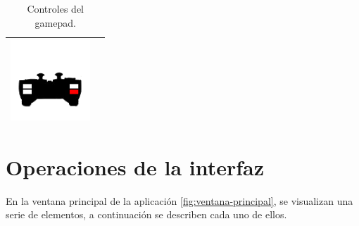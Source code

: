 \begin{table}[H]
\begin{center}
\begin{tabular}{|p{3cm}|p{8cm}|}
      \hline
      \includegraphics[width=3cm]{./imagenes/pad-12.png} & \vspace*{-.8in}{Sin función.} \\
      \hline
    \end{tabular}
  \end{center}
  \caption{Controles del gamepad.}
\end{table}


\section{Operaciones de la interfaz}
\label{sec:operaciones-interfaz}

En la ventana principal de la aplicación \ref{fig:ventana-principal}, se visualizan una serie de elementos, a continuación se describen cada uno de ellos.


